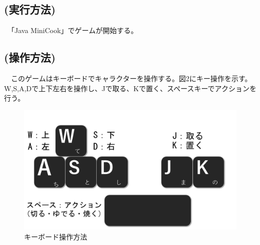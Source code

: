 \documentclass[a4j]{jarticle} %
\begin{document}
\subsection*{(実行方法)}
　「Java MiniCook」でゲームが開始する。
\subsection*{(操作方法)}
　このゲームはキーボードでキャラクターを操作する。図2にキー操作を示す。W,S,A,Dで上下左右を操作し、Jで取る、Kで置く、スペースキーでアクションを行う。
\begin{figure}[H]
  \begin{center}
  \includegraphics[scale=0.2]{img/key.png}
  \caption{キーボード操作方法}
  \end{center}
\end{figure}
\end{document}
